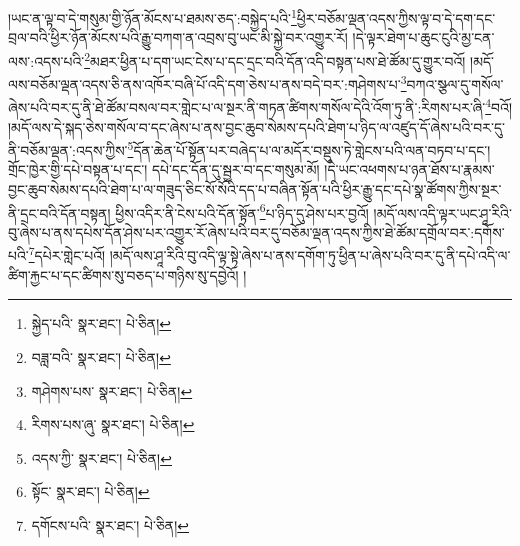 །ཡང་ན་ལྟ་བ་དེ་གསུམ་གྱི་ཉོན་མོངས་པ་ཐམས་ཅད་:བསྐྱེད་པའི་\footnote{སྐྱེད་པའི་  སྣར་ཐང་།  པེ་ཅིན། }ཕྱིར་བཅོམ་ལྡན་འདས་ཀྱིས་ལྟ་བ་དེ་དག་དང་བྲལ་བའི་ཕྱིར་ཉོན་མོངས་པའི་རྒྱུ་བཀག་ན་འབྲས་བུ་ཡང་མི་སྐྱེ་བར་འགྱུར་རོ། །དེ་ལྟར་ཐེག་པ་ཆུང་ངུའི་མྱ་ངན་ལས་:འདས་པའི་\footnote{བཟླ་བའི་  སྣར་ཐང་།  པེ་ཅིན། }མཐར་ཕྱིན་པ་དག་ཡང་ངེས་པ་དང་དྲང་བའི་དོན་འདི་བསྟན་པས་ཐེ་ཚོམ་དུ་གྱུར་བའོ། །མདོ་ལས་བཅོམ་ལྡན་འདས་ཅི་ནས་འཁོར་བཞི་པོ་འདི་དག་ཅེས་པ་ནས་བདེ་བར་:གཤེགས་པ་\footnote{གཤེགས་པས་  སྣར་ཐང་།  པེ་ཅིན། }བཀའ་སྩལ་དུ་གསོལ་ཞེས་པའི་བར་དུ་ནི་ཐེ་ཚོམ་བསལ་བར་གླེང་པ་ལ་སྔར་ནི་གཏན་ཚིགས་གསོལ་དེའི་འོག་ཏུ་ནི་:རིགས་པར་ཞི་\footnote{རིགས་པས་ཞུ་  སྣར་ཐང་།  པེ་ཅིན། }བའོ། །མདོ་ལས་དེ་སྐད་ཅེས་གསོལ་བ་དང་ཞེས་པ་ནས་བྱང་ཆུབ་སེམས་དཔའི་ཐེག་པ་ཉིད་ལ་འཛུད་དོ་ཞེས་པའི་བར་དུ་ནི་བཅོམ་ལྡན་:འདས་ཀྱིས་\footnote{འདས་ཀྱི་  སྣར་ཐང་།  པེ་ཅིན། }དོན་ཆེན་པོ་སྟོན་པར་བཞེད་པ་ལ་མདོར་བསྡུས་ཏེ་གླེངས་པའི་ལན་བཏབ་པ་དང་། གྲོང་ཁྱེར་གྱི་དཔེ་བསྟན་པ་དང་། དཔེ་དང་དོན་དུ་སྦྱར་བ་དང་གསུམ་མོ། །དེ་ཡང་འཕགས་པ་ཉན་ཐོས་པ་རྣམས་བྱང་ཆུབ་སེམས་དཔའི་ཐེག་པ་ལ་གཟུད་ཅིང་སོ་སོའི་དད་པ་བཞིན་སྟོན་པའི་ཕྱིར་རྒྱུ་དང་དཔེ་སྣ་ཚོགས་ཀྱིས་སྔར་ནི་དྲང་བའི་དོན་བསྟན། ཕྱིས་འདིར་ནི་ངེས་པའི་དོན་སྟོན་\footnote{སྟོང་  སྣར་ཐང་།  པེ་ཅིན། }པ་ཉིད་དུ་ཤེས་པར་བྱའོ། །མདོ་ལས་འདི་ལྟར་ཡང་ཤཱ་རིའི་བུ་ཞེས་པ་ནས་དཔེས་དོན་ཤེས་པར་འགྱུར་རོ་ཞེས་པའི་བར་དུ་བཅོམ་ལྡན་འདས་ཀྱིས་ཐེ་ཚོམ་དགྲོལ་བར་:དགོས་པའི་\footnote{དགོངས་པའི་  སྣར་ཐང་།  པེ་ཅིན། }དཔེར་གླེང་པའོ། །མདོ་ལས་ཤཱ་རིའི་བུ་འདི་ལྟ་སྟེ་ཞེས་པ་ནས་དགོག་ཏུ་ཕྱིན་པ་ཞེས་པའི་བར་དུ་ནི་དཔེ་འདི་ལ་ཚིག་རྐྱང་པ་དང་ཚིགས་སུ་བཅད་པ་གཉིས་སུ་དབྱེའོ། །
